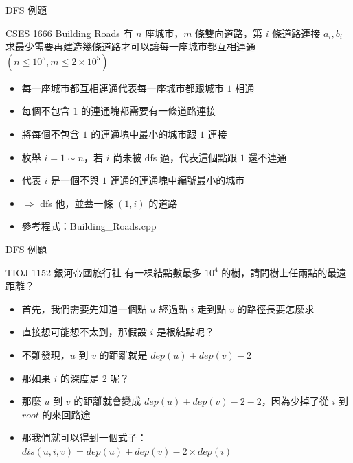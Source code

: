 \documentclass[aspectratio=169]{beamer}
\begin{document}
    \begin{frame}{DFS 例題}
        \begin{block}{CSES 1666 Building Roads}
            有 $n$ 座城市，$m$ 條雙向道路，第 $i$ 條道路連接 $a_i, b_i$\\
            求最少需要再建造幾條道路才可以讓每一座城市都互相連通\\
            $(n \le 10^5, m \le 2 \times 10^5)$
        \end{block}
        
        \begin{itemize}
            \item<2-> 每一座城市都互相連通代表每一座城市都跟城市 $1$ 相通
            \item<3-> 每個不包含 $1$ 的連通塊都需要有一條道路連接
            \item<4-> 將每個不包含 $1$ 的連通塊中最小的城市跟 $1$ 連接
            \item<5-> 枚舉 $i = 1 \sim n$，若 $i$ 尚未被 dfs 過，代表這個點跟 $1$ 還不連通
            \item<6-> 代表 $i$ 是一個不與 $1$ 連通的連通塊中編號最小的城市
            \item<7-> $\Rightarrow$ dfs 他，並蓋一條 $(1, i)$ 的道路
            \item<8-> 參考程式：Building\_Roads.cpp
        \end{itemize}
    \end{frame}
    
    \begin{frame}{DFS 例題}
        \begin{block}{TIOJ 1152 銀河帝國旅行社}
            有一棵結點數最多 $10^4$ 的樹，請問樹上任兩點的最遠距離？
        \end{block}

        \begin{itemize}
            \item<2-> 首先，我們需要先知道一個點 $u$ 經過點 $i$ 走到點 $v$ 的路徑長要怎麼求
            \item<3-> 直接想可能想不太到，那假設 $i$ 是根結點呢？
            \item<4-> 不難發現，$u$ 到 $v$ 的距離就是 $dep(u) + dep(v) - 2$
            \item<5-> 那如果 $i$ 的深度是 $2$ 呢？
            \item<6-> 那麼 $u$ 到 $v$ 的距離就會變成 $dep(u) + dep(v) - 2 - 2$，因為少掉了從 $i$ 到 $root$ 的來回路途
            \item<6-> 那我們就可以得到一個式子：$dis(u, i, v) = dep(u) + dep(v) - 2 \times dep(i)$
        \end{itemize}
    \end{frame}
\end{document}
